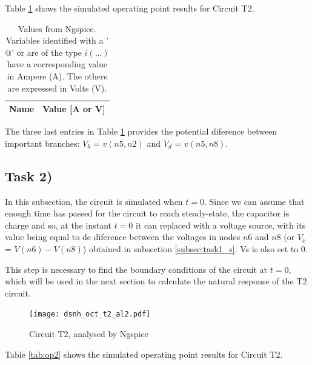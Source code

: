Table \ref{tab:op1} shows the simulated operating point results for Circuit T2.

\begin{table}[H]
	\centering
	\begin{tabular}{|l|r|}
		\hline    
		{\bf Name} & {\bf Value [A or V]} \\ \hline
    		
	\end{tabular}
	
	\caption{Values from Ngspice. Variables identified with a '$@$' or are of the type
	$i(...)$ have a corresponding value in Ampere (A). The others are expressed in Volts (V).}
    
\label{tab:op1}
\end{table}

The three last entries in Table \ref{tab:op1} provides the potential diference between important
branches: $V_b$ = $v(n5,n2)$ and $V_d$ = $v(n5,n8)$.


\subsection{Task 2)}
\label{subsec:task2_s}


In this subsection, the circuit is simulated when $t=0$. Since we can assume that enough time has passed for the circuit to reach steady-state, the capacitor is charge and so, at the instant $t=0$ it can replaced with a voltage source, 
with its value being equal to de diference between the voltages in nodes $n6$ and $n8$ (or $V_x$ = $V(n6)-
V(n8)$) obtained in subsection \ref{subsec:task1_s}. Vs is also set to 0.

This step is necessary to find the boundary conditions of the circuit at $t=0$, which will be used in the next section to calculate the natural response of the T2 circuit.

\begin{figure}[H]
	\centering
	\texttt{[image: dsnh\_oct\_t2\_al2.pdf]}
	\caption{Circuit T2, analysed by Ngspice}
\label{fig:Dsnh_sim_t2}
\end{figure}

Table \ref{tab:op2} shows the simulated operating point results for Circuit T2.

